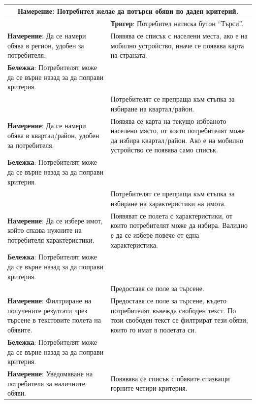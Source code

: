 \documentclass[a4paper]{article}
\begin{document}
\begin{center}
  \begin{tabular}{ |p{6cm}|p{10cm}| }
    \hline
    \multicolumn{2}{|c|}{\textbf{Намерение}: Потребител желае да потърси обяви по даден критерий.} \\    \hline
    & \textbf{Тригер}: Потребител натиска бутон ``Търси''. \\    \hline
    \textbf{Намерение}: Да се намери обява в регион, удобен за потребителя. & Появява се списък с населени места, ако е на мобилно устройство, иначе се появява карта на страната. \\    \hline
    \textbf{Бележка}: Потребителят може да се върне назад за да поправи критерия. & \\    \hline
      & Потребителят се препраща към стъпка за избиране на квартал/район. \\    \hline
    \textbf{Намерение}: Да се намери обява в квартал/район, удобен за потребителя. & Появява се карта на текущо избраното населено място, от която потребителят може да избира квартал/район. Ако е на мобилно устройство се появява само списък. \\    \hline
    \textbf{Бележка}: Потребителят може да се върне назад за да поправи критерия. & \\    \hline
     & Потребителят се препраща към стъпка за избиране на характеристики на имота. \\    \hline
    \textbf{Намерение}: Да се избере имот, който спазва нужните на потребителя характеристики. & Появяват се полета с характеристики, от които потребителят може да избира. Валидно е да се избере повече от една характеристика. \\    \hline
    \textbf{Бележка}: Потребителят може да се върне назад за да поправи критерия. & \\    \hline
     & Предоставя се поле за търсене. \\    \hline
    \textbf{Намерение}: Филтриране на получените резултати чрез търсене в текстовите полета на обявите. & Предоставя се поле за търсене, където потребителят въвежда свободен текст. По този свободен текст се филтрират тези обяви, които го имат в полетата си. \\    \hline
    \textbf{Бележка}: Потребителят може да се върне назад за да поправи критерия. & \\    \hline
    \textbf{Намерение}: Уведомяване на потребителя за наличните обяви. & Повявява се списък с обявите спазващи горните четири критерия. \\    \hline
  \end{tabular}
\end{center}
\end{document}
